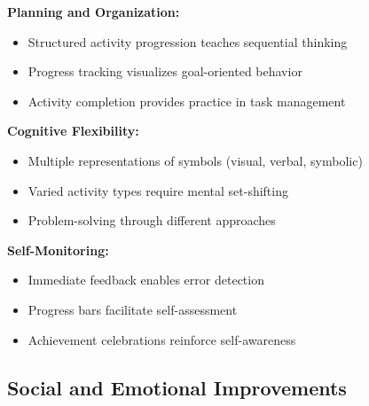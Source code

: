 \documentclass[12pt, a4paper]{article}
\begin{document}
\begin{tcolorbox}[colback=aliengreen!5, colframe=aliengreen, title=\textbf{4. Executive Function Development}]

\textbf{Planning and Organization:}
\begin{itemize}
    \item Structured activity progression teaches sequential thinking
    \item Progress tracking visualizes goal-oriented behavior
    \item Activity completion provides practice in task management
\end{itemize}

\textbf{Cognitive Flexibility:}
\begin{itemize}
    \item Multiple representations of symbols (visual, verbal, symbolic)
    \item Varied activity types require mental set-shifting
    \item Problem-solving through different approaches
\end{itemize}

\textbf{Self-Monitoring:}
\begin{itemize}
    \item Immediate feedback enables error detection
    \item Progress bars facilitate self-assessment
    \item Achievement celebrations reinforce self-awareness
\end{itemize}

\end{tcolorbox}

\subsection{Social and Emotional Improvements}
\end{document}
